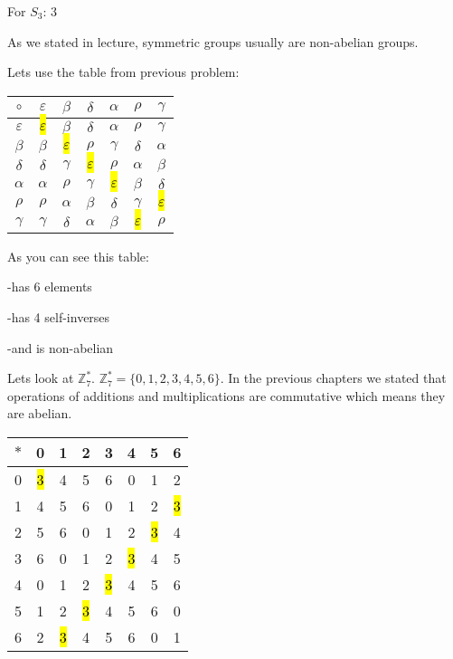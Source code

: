 \documentclass{article}
\begin{document}
\medskip

For $S_3$: 3

As we stated in lecture, symmetric groups usually are non-abelian groups. 



Lets use the table from previous problem: 

\begin{table} [ht]
\begin{tabular} {|c| |c| |c| |c| |c| |c| |c|}

	\hline
	$\circ$ & $\varepsilon$ & $\beta$ & $\delta$ & $\alpha$ & $\rho$  & $\gamma$ \\

	\hline
	$\varepsilon$ & \hl{$\varepsilon$} & $\beta$ &  $\delta$ & $\alpha$  & $\rho$ &  $\gamma$ \\

	\hline
	$\beta$ & $\beta$  & \hl{$\varepsilon$} & $\rho$ & $\gamma$ & $\delta$ & $\alpha$ \\

	\hline
	$\delta$ &$\delta$ &  $\gamma$ & \hl{$\varepsilon$} & $\rho$ &  $\alpha$ & $\beta$ \\

	\hline
	$\alpha$ & $\alpha$ & $\rho$ & $\gamma$ & \hl{$\varepsilon$} & $\beta$ & $\delta$ \\

	\hline
	$\rho$ & $\rho$ & $\alpha$ & $\beta$ & $\delta$ & $\gamma$ & \hl{$\varepsilon$}  \\ 

	\hline
	$\gamma$ & $\gamma$ & $\delta$ & $\alpha$ & $\beta$ & \hl{$\varepsilon$} & $\rho$
	\end{tabular}
\end{table}

As you can see this table:

-has 6 elements

-has 4 self-inverses

-and is non-abelian
\medskip


Lets look at  $\mathbb{Z}_7^{*}$.  $\mathbb{Z}_7^{*}=\{0, 1, 2, 3, 4, 5, 6\}$. In the previous chapters we stated that operations of additions and multiplications are commutative which means they are abelian.

\begin{table} [ht]
\begin{tabular} {|c| |c| |c| |c| |c| |c| |c| |c|}
\hline
$*$ & 0 & 1 & 2 & 3 & 4 & 5 & 6 \\
\hline
0 & \hl{3} & 4 & 5 & 6 & 0 & 1 & 2 \\
\hline
1 & 4 & 5 & 6 & 0 & 1 & 2 & \hl{3} \\
\hline
2 & 5 & 6 & 0 & 1 & 2 & \hl{3} & 4  \\
\hline
3 & 6 & 0 & 1 & 2 & \hl{3} & 4 & 5 \\
\hline
4 & 0 & 1 & 2 & \hl{3} & 4 & 5 & 6 \\
\hline
5 & 1 & 2 & \hl{3} & 4 & 5 & 6 & 0 \\
\hline
6 & 2 & \hl{3} & 4 & 5 & 6 & 0 & 1
\end{tabular}
\end{table}
\end{document}
